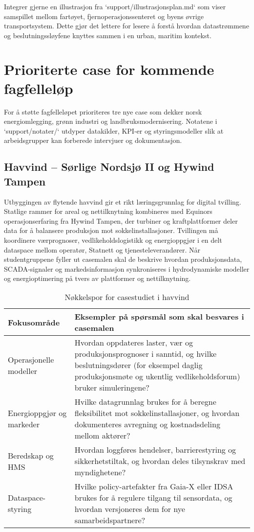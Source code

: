 Integrer gjerne en illustrasjon fra `support/illustrasjonsplan.md` som viser samspillet mellom fartøyet, fjernoperasjonssenteret og byens øvrige transportsystem. Dette gjør det lettere for lesere å forstå hvordan datastrømmene og beslutningssløyfene knyttes sammen i en urban, maritim kontekst.

\section{Prioriterte case for kommende fagfelleløp}
For å støtte fagfelleløpet prioriteres tre nye case som dekker norsk energiomlegging, grønn industri og landbruksmodernisering. Notatene i `support/notater/` utdyper datakilder, KPI-er og styringsmodeller slik at arbeidsgrupper kan forberede intervjuer og dokumentasjon.

\subsection*{Havvind – Sørlige Nordsjø II og Hywind Tampen}
Utbyggingen av flytende havvind gir et rikt læringsgrunnlag for digital tvilling. Statlige rammer for areal og nettilknytning kombineres med Equinors operasjonserfaring fra Hywind Tampen, der turbiner og kraftplattformer deler data for å balansere produksjon mot sokkelinstallasjoner.\citep{nve2023havvindfakta,equinor2023hywindtampen} Tvillingen må koordinere værprognoser, vedlikeholdslogistikk og energioppgjør i en delt dataspace mellom operatør, Statnett og tjenesteleverandører. Når studentgruppene fyller ut casemalen skal de beskrive hvordan produksjonsdata, SCADA-signaler og markedsinformasjon synkroniseres i hydrodynamiske modeller og energioptimering på tvers av plattformer og nettilknytning.

\begin{table}[h]
    \centering
    \caption{Nøkkelspor for casestudiet i havvind}
    \label{tab:havvind-spor}
    \begin{tabular}{p{3.5cm}p{8.5cm}}
        \toprule
        Fokusområde & Eksempler på spørsmål som skal besvares i casemalen \\
        \midrule
        Operasjonelle modeller & Hvordan oppdateres laster, vær og produksjonsprognoser i sanntid, og hvilke beslutningsdører (for eksempel daglig produksjonsmøte og ukentlig vedlikeholdsforum) bruker simuleringene? \\
        Energioppgjør og markeder & Hvilke datagrunnlag brukes for å beregne fleksibilitet mot sokkelinstallasjoner, og hvordan dokumenteres avregning og kostnadsdeling mellom aktører? \\
        Beredskap og HMS & Hvordan loggføres hendelser, barrierestyring og sikkerhetstiltak, og hvordan deles tilsynskrav med myndighetene? \\
        Dataspace-styring & Hvilke policy-artefakter fra Gaia-X eller IDSA brukes for å regulere tilgang til sensordata, og hvordan versjoneres dem for nye samarbeidspartnere? \\
        \bottomrule
    \end{tabular}
\end{table}

